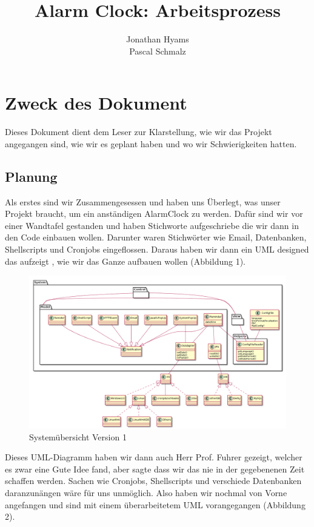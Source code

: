 \documentclass[11pt,titelpage]{scrartcl}
\title{Alarm Clock: Arbeitsprozess }
\author{Jonathan Hyams \\Pascal Schmalz}
\begin{document}
\thispagestyle{empty}
\maketitle
\pagebreak
\tableofcontents

\pagestyle{fancy}


\begin{abstract}
\end{abstract}
\pagebreak


\section{Zweck des Dokument}
Dieses Dokument dient dem Leser zur Klarstellung, wie wir das Projekt angegangen sind, wie wir es geplant haben und wo wir Schwierigkeiten hatten.
\subsection{Planung}
Als erstes sind wir Zusammengesessen und haben uns Überlegt, was unser Projekt braucht, um ein anständigen AlarmClock zu werden. Dafür sind wir
vor einer Wandtafel gestanden und haben Stichworte aufgeschriebe die wir dann in den Code einbauen wollen. Darunter waren Stichwörter wie
Email, Datenbanken, Shellscripts und Cronjobs eingeflossen. Daraus haben wir dann ein UML designed das aufzeigt , wie wir das Ganze aufbauen wollen (Abbildung 1).
\begin{landscape}
\begin{figure}
  \centering
    \includegraphics[width=1\textwidth]{../uml/uebersicht00.png}
  \caption{Systemübersicht Version 1}
  \label{fig:overview}
\end{figure}
\end{landscape}
Dieses UML-Diagramm haben wir dann auch Herr Prof. Fuhrer gezeigt, welcher es zwar eine Gute Idee fand, aber sagte dass wir das nie in der gegebenenen
Zeit schaffen werden. Sachen wie Cronjobs, Shellscripts und verschiede Datenbanken daranzunängen wäre für uns unmöglich.
Also haben wir nochmal von Vorne angefangen und sind mit einem überarbeitetem UML vorangegangen (Abbildung 2).
\end{document}
